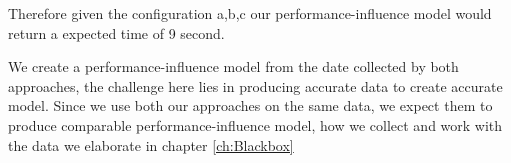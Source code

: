 Therefore given the configuration a,b,c our performance-influence model would return a expected time of 9 second.

We create a performance-influence model from the date collected by both approaches, the challenge here lies in producing accurate data
to create accurate model. Since we use both our approaches on the same data, we expect them to produce comparable performance-influence model,
how we collect and work with the data we elaborate in chapter \ref{ch:Blackbox}%